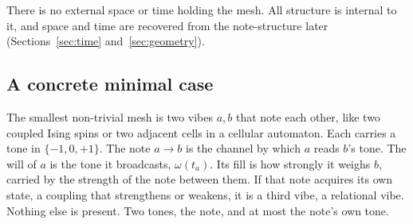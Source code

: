 There is no external space or time holding the mesh. All structure is internal to it, and space and time are recovered from the note-structure later (Sections~\ref{sec:time} and~\ref{sec:geometry}).

\subsection{A concrete minimal case}

The smallest non-trivial mesh is two vibes $a, b$ that note each other, like two coupled Ising spins or two adjacent cells in a cellular automaton. Each carries a tone in $\{-1,0,+1\}$. The note $a \to b$ is the channel by which $a$ reads $b$'s tone. The will of $a$ is the tone it broadcasts, $\omega(t_a)$. Its fill is how strongly it weighs $b$, carried by the strength of the note between them. If that note acquires its own state, a coupling that strengthens or weakens, it is a third vibe, a relational vibe. Nothing else is present. Two tones, the note, and at most the note's own tone.
